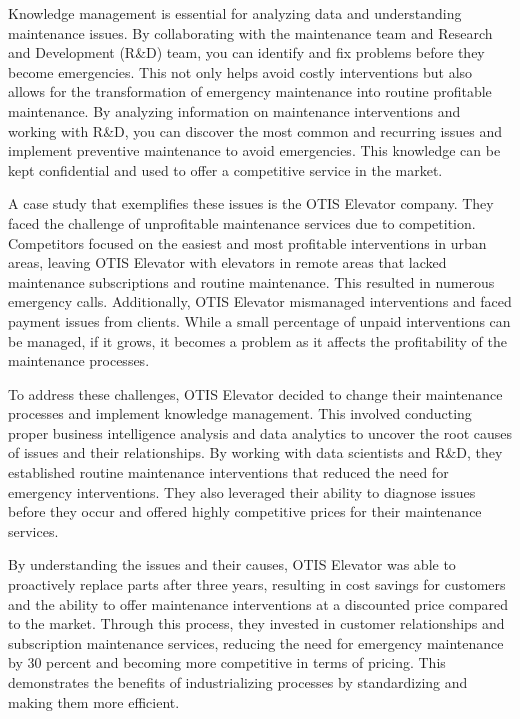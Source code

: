 Knowledge management is essential for analyzing data and understanding
maintenance issues. By collaborating with the maintenance team and Research and Development (R\&D) team, you can identify and fix problems before they become emergencies. This
not only helps avoid costly interventions but also allows for the
transformation of emergency maintenance into routine profitable
maintenance. By analyzing information on maintenance interventions and
working with R\&D, you can discover the most common and recurring issues
and implement preventive maintenance to avoid emergencies. This
knowledge can be kept confidential and used to offer a competitive
service in the market.


A case study that exemplifies these issues is the OTIS Elevator company. They
faced the challenge of unprofitable maintenance services due to
competition. Competitors focused on the easiest and most profitable
interventions in urban areas, leaving OTIS Elevator with elevators in
remote areas that lacked maintenance subscriptions and routine
maintenance. This resulted in numerous emergency calls. Additionally,
OTIS Elevator mismanaged interventions and faced payment issues from
clients. While a small percentage of unpaid interventions can be
managed, if it grows, it becomes a problem as it affects the
profitability of the maintenance processes.


To address these challenges, OTIS Elevator decided to change their
maintenance processes and implement knowledge management. This involved
conducting proper business intelligence analysis and data analytics to
uncover the root causes of issues and their relationships. By working
with data scientists and R\&D, they established routine maintenance
interventions that reduced the need for emergency interventions. They
also leveraged their ability to diagnose issues before they occur and
offered highly competitive prices for their maintenance services.

By understanding the issues and their causes, OTIS Elevator was able
to proactively replace parts after three years, resulting in cost
savings for customers and the ability to offer maintenance interventions
at a discounted price compared to the market. Through this process, they
invested in customer relationships and subscription maintenance
services, reducing the need for emergency maintenance by 30 percent and
becoming more competitive in terms of pricing. This demonstrates the
benefits of industrializing processes by standardizing and making them
more efficient.

